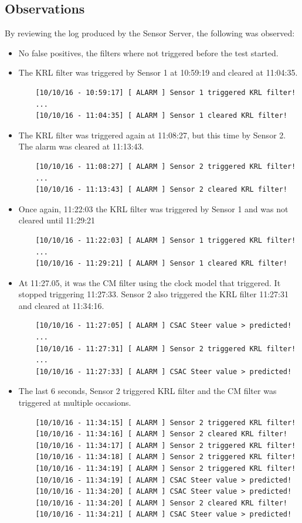 \documentclass[12pt,english,a4paper]{report}
\begin{document}
\subsection{Observations}\label{observations}
By reviewing the log produced by the Sensor Server, the following was observed:

\begin{itemize}
  \item No false positives, the filters where not triggered before the test started.
  \item The KRL filter was triggered by Sensor 1 at 10:59:19 and cleared at 11:04:35.
  \begin{lstlisting}
    [10/10/16 - 10:59:17] [ ALARM ] Sensor 1 triggered KRL filter!
    ...
    [10/10/16 - 11:04:35] [ ALARM ] Sensor 1 cleared KRL filter!
  \end{lstlisting}
  \item The KRL filter was triggered again at 11:08:27, but this time by Sensor 2. The alarm was cleared at 11:13:43.
    \begin{lstlisting}
    [10/10/16 - 11:08:27] [ ALARM ] Sensor 2 triggered KRL filter!
    ...
    [10/10/16 - 11:13:43] [ ALARM ] Sensor 2 cleared KRL filter!
  \end{lstlisting}
  \item Once again, 11:22:03 the KRL filter was triggered by Sensor 1 and was not cleared until 11:29:21
     \begin{lstlisting}
    [10/10/16 - 11:22:03] [ ALARM ] Sensor 1 triggered KRL filter!
    ...
    [10/10/16 - 11:29:21] [ ALARM ] Sensor 1 cleared KRL filter!
  \end{lstlisting} 
  \item At 11:27.05, it was the CM filter using the clock model that triggered. It stopped triggering 11:27:33. Sensor 2 also triggered the KRL filter 11:27:31 and cleared at 11:34:16.
    \begin{lstlisting}
    [10/10/16 - 11:27:05] [ ALARM ] CSAC Steer value > predicted!
    ...
    [10/10/16 - 11:27:31] [ ALARM ] Sensor 2 triggered KRL filter!
    ...
    [10/10/16 - 11:27:33] [ ALARM ] CSAC Steer value > predicted!
  \end{lstlisting} 
  \item The last 6 seconds, Sensor 2 triggered KRL filter and the CM filter was triggered at multiple occasions.
  \begin{lstlisting}
    [10/10/16 - 11:34:15] [ ALARM ] Sensor 2 triggered KRL filter!
    [10/10/16 - 11:34:16] [ ALARM ] Sensor 2 cleared KRL filter!
    [10/10/16 - 11:34:17] [ ALARM ] Sensor 2 triggered KRL filter!
    [10/10/16 - 11:34:18] [ ALARM ] Sensor 2 triggered KRL filter!
    [10/10/16 - 11:34:19] [ ALARM ] Sensor 2 triggered KRL filter!
    [10/10/16 - 11:34:19] [ ALARM ] CSAC Steer value > predicted!
    [10/10/16 - 11:34:20] [ ALARM ] CSAC Steer value > predicted!
    [10/10/16 - 11:34:20] [ ALARM ] Sensor 2 cleared KRL filter!
    [10/10/16 - 11:34:21] [ ALARM ] CSAC Steer value > predicted!
  \end{lstlisting} 
\end{itemize}
\end{document}
